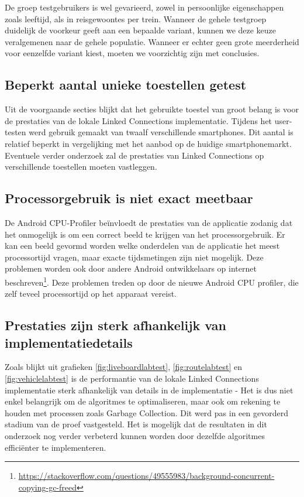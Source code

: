 De groep testgebruikers is wel gevarieerd, zowel in persoonlijke eigenschappen zoals leeftijd, als in reisgewoontes per trein. Wanneer de gehele testgroep duidelijk de voorkeur geeft aan een bepaalde variant, kunnen we deze keuze veralgemenen naar de gehele populatie. Wanneer er echter geen grote meerderheid voor eenzelfde variant kiest, moeten we voorzichtig zijn met conclusies.

\subsection{Beperkt aantal unieke toestellen getest}
Uit de voorgaande secties blijkt dat het gebruikte toestel van groot belang is voor de prestaties van de lokale Linked Connections implementatie. Tijdens het user-testen werd gebruik gemaakt van twaalf verschillende smartphones. Dit aantal is relatief beperkt in vergelijking met het aanbod op de huidige smartphonemarkt. Eventuele verder onderzoek zal de prestaties van Linked Connections op verschillende toestellen moeten vastleggen.

\subsection{Processorgebruik is niet exact meetbaar}
De Android CPU-Profiler beïnvloedt de prestaties van de applicatie zodanig dat het onmogelijk is om een correct beeld te krijgen van het processorgebruik. Er kan een beeld gevormd worden welke onderdelen van de applicatie het meest processortijd vragen, maar exacte tijdsmetingen zijn niet mogelijk. Deze problemen worden ook door andere Android ontwikkelaars op internet beschreven\footnote{\url{https://stackoverflow.com/questions/49555983/background-concurrent-copying-gc-freed}}. Deze problemen treden op door de nieuwe Android CPU profiler, die zelf teveel processortijd op het apparaat vereist.

\subsection{Prestaties zijn sterk afhankelijk van implementatiedetails}
Zoals blijkt uit grafieken \ref{fig:liveboardlabtest}, \ref{fig:routelabtest} en \ref{fig:vehiclelabtest} is de performantie van de lokale Linked Connections implementatie sterk afhankelijk van details in de implementatie - Het is dus niet enkel belangrijk om de algoritmes te optimaliseren, maar ook om rekening te houden met processen zoals Garbage Collection. Dit werd pas in een gevorderd stadium van de proef vastgesteld. Het is mogelijk dat de resultaten in dit onderzoek nog verder verbeterd kunnen worden door dezelfde algoritmes efficiënter te implementeren.


